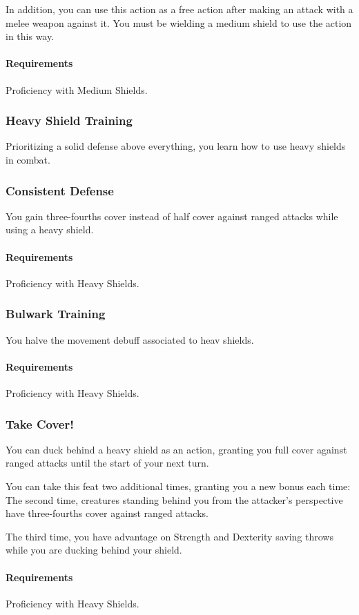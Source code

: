     In addition, you can use this action as a free action after making an attack with a melee weapon against it.
    You must be wielding a medium shield to use the action in this way.
    \paragraph{Requirements} Proficiency with Medium Shields.
\subsubsection{Heavy Shield Training} \label{feat::heavyshieldtraining}
    Prioritizing a solid defense above everything, you learn how to use heavy shields in combat.
\subsubsection{Consistent Defense} \label{feat::consistentefense}
    You gain three-fourths cover instead of half cover against ranged attacks while using a heavy shield.
    \paragraph{Requirements} Proficiency with Heavy Shields.
\subsubsection{Bulwark Training} \label{feat::bulwarktraining}
    You halve the movement debuff associated to heav shields.
    \paragraph{Requirements} Proficiency with Heavy Shields.
\subsubsection{Take Cover!} \label{feat::takecover}
    You can duck behind a heavy shield as an action, granting you full cover against ranged attacks until the start of your next turn.

    You can take this feat two additional times, granting you a new bonus each time:
    The second time, creatures standing behind you from the attacker's perspective have three-fourths cover against ranged attacks.

    The third time, you have advantage on Strength and Dexterity saving throws while you are ducking behind your shield.
    \paragraph{Requirements} Proficiency with Heavy Shields.
